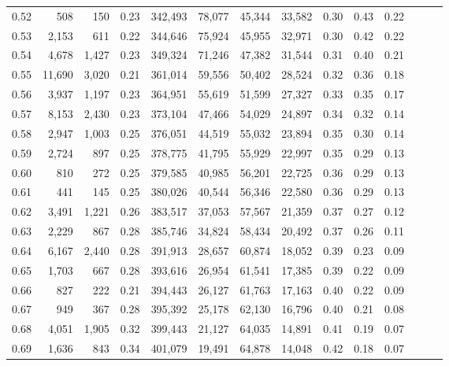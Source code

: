 \begin{tabular}{rrrrrrrrrrrrrr}
0.52 &     508 &    150 &  0.23 &  342,493 &   78,077 &  45,344 &  33,582 &  0.30 &  0.43 &      0.22 \\
0.53 &   2,153 &    611 &  0.22 &  344,646 &   75,924 &  45,955 &  32,971 &  0.30 &  0.42 &      0.22 \\
0.54 &   4,678 &  1,427 &  0.23 &  349,324 &   71,246 &  47,382 &  31,544 &  0.31 &  0.40 &      0.21 \\
0.55 &  11,690 &  3,020 &  0.21 &  361,014 &   59,556 &  50,402 &  28,524 &  0.32 &  0.36 &      0.18 \\
0.56 &   3,937 &  1,197 &  0.23 &  364,951 &   55,619 &  51,599 &  27,327 &  0.33 &  0.35 &      0.17 \\
0.57 &   8,153 &  2,430 &  0.23 &  373,104 &   47,466 &  54,029 &  24,897 &  0.34 &  0.32 &      0.14 \\
0.58 &   2,947 &  1,003 &  0.25 &  376,051 &   44,519 &  55,032 &  23,894 &  0.35 &  0.30 &      0.14 \\
0.59 &   2,724 &    897 &  0.25 &  378,775 &   41,795 &  55,929 &  22,997 &  0.35 &  0.29 &      0.13 \\
0.60 &     810 &    272 &  0.25 &  379,585 &   40,985 &  56,201 &  22,725 &  0.36 &  0.29 &      0.13 \\
0.61 &     441 &    145 &  0.25 &  380,026 &   40,544 &  56,346 &  22,580 &  0.36 &  0.29 &      0.13 \\
0.62 &   3,491 &  1,221 &  0.26 &  383,517 &   37,053 &  57,567 &  21,359 &  0.37 &  0.27 &      0.12 \\
0.63 &   2,229 &    867 &  0.28 &  385,746 &   34,824 &  58,434 &  20,492 &  0.37 &  0.26 &      0.11 \\
0.64 &   6,167 &  2,440 &  0.28 &  391,913 &   28,657 &  60,874 &  18,052 &  0.39 &  0.23 &      0.09 \\
0.65 &   1,703 &    667 &  0.28 &  393,616 &   26,954 &  61,541 &  17,385 &  0.39 &  0.22 &      0.09 \\
0.66 &     827 &    222 &  0.21 &  394,443 &   26,127 &  61,763 &  17,163 &  0.40 &  0.22 &      0.09 \\
0.67 &     949 &    367 &  0.28 &  395,392 &   25,178 &  62,130 &  16,796 &  0.40 &  0.21 &      0.08 \\
0.68 &   4,051 &  1,905 &  0.32 &  399,443 &   21,127 &  64,035 &  14,891 &  0.41 &  0.19 &      0.07 \\
0.69 &   1,636 &    843 &  0.34 &  401,079 &   19,491 &  64,878 &  14,048 &  0.42 &  0.18 &      0.07 \\

\end{tabular}
